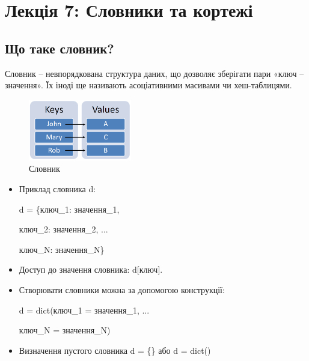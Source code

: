 \section{Лекція 7: Словники та кортежі}
 
 \subsection{Що таке словник?} 
\begin{frame}
Словник – невпорядкована структура даних, що дозволяє зберігати пари «ключ – значення». Їх іноді ще називають асоціативними масивами чи хеш-таблицями.

\begin{figure}
\begin{center}
 \includegraphics[width=0.4\textwidth]{pictures/dict.png}
\caption{Словник}
\label{dict} 
\end{center}
\end{figure}

\end{frame}

\begin{frame}

\begin{itemize}
  \item 
  Приклад словника d:

 d = \{ключ\_1: значення\_1,
 
  ключ\_2: значення\_2, ... 

ключ\_N: значення\_N\}
\item Доступ до значення словника: d[ключ].

\item
Створювати словники можна за допомогою конструкції:

d = dict(ключ\_1 = значення\_1, ...

 ключ\_N = значення\_N)
 
 \item Визначення пустого словника d = \{\} або d = dict()
\end{itemize}

\end{frame}


